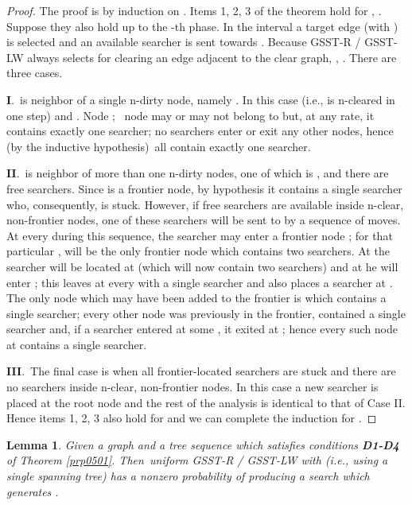 \documentclass[11pt]{article}\usepackage{amsmath}
\newtheorem{lemma}[theorem]{Lemma}
{\theoremstyle{definition}
\newtheorem{notation}[theorem]{Notation}
}
\begin{document}
\begin{proof}
The proof is by induction on . Items 1, 2, 3 of the theorem hold for ,
. Suppose they also
hold up to the -th phase. In the interval  a target edge  (with ) is selected
and an available searcher is sent towards . Because GSST-R /
GSST-LW always selects for clearing an edge adjacent to the clear graph,
 ,  . There are three cases.

\noindent\textbf{I}.\  is neighbor of a single n-dirty node, namely
. In this case  (i.e.,  is n-cleared in one
step) and .
Node ; \ node  may or
may not belong to  but, at any rate, it
contains exactly one searcher; no searchers enter or exit any other nodes,
hence (by the inductive hypothesis)\ all  contain exactly one searcher.

\noindent\textbf{II}.\  is neighbor of more than one n-dirty nodes, one
of which is , and there are free searchers. Since  is a
frontier node, by hypothesis it contains a single searcher who, consequently,
is stuck. However, if free searchers are available inside n-clear,
non-frontier nodes, one of these searchers will be sent to  by a
sequence of moves. At every  during this sequence, the searcher may enter a
frontier node ; for that particular ,  will be the only frontier node
which contains two searchers. At  the searcher will be located at
 (which will now contain two searchers) and at  he will enter
; this leaves at  every  with a single searcher and also places a searcher at . The only
node which may have been added to the frontier is  which contains a
single searcher; every other node  was
previously in the frontier, contained a single searcher and, if a searcher
entered  at some , it exited  at
; hence every such node at  contains a single searcher.

\noindent\textbf{III}.\ The final case is when all frontier-located searchers
are stuck and there are no searchers inside n-clear, non-frontier nodes. In
this case a new searcher is placed at the root node and the rest of the
analysis is identical to that of Case II. Hence items 1, 2, 3 also hold for
 and we can complete the induction for
.
\end{proof}

\begin{lemma}
\label{prp0508}Given a graph  and a tree
sequence 
which satisfies conditions \textbf{D1-D4} of Theorem \ref{prp0501}.
Then\ uniform GSST-R / GSST-LW with  (i.e., using a single spanning tree)
has a nonzero probability of producing a search  which generates
.
\end{lemma}
\end{document}
